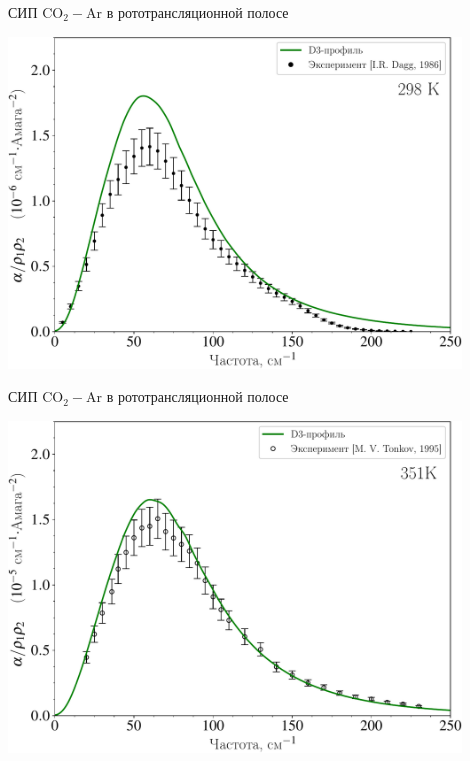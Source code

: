 \documentclass[10pt,usenames,pdf,hyperref={unicode},dvipsnames]{beamer}
\begin{document}
\begin{frame}{СИП CO$_2-$Ar в рототрансляционной полосе}
	\begin{center}
		\includegraphics[width=0.9\textwidth]{./pictures/co2ar_298K-crop.pdf}
	\end{center}
\end{frame}

\begin{frame}{СИП CO$_2-$Ar в рототрансляционной полосе}
	\begin{center}
		\includegraphics[width=0.9\textwidth]{./pictures/351K_russian_legend-crop.pdf}
	\end{center}
\end{frame}
\end{document}
